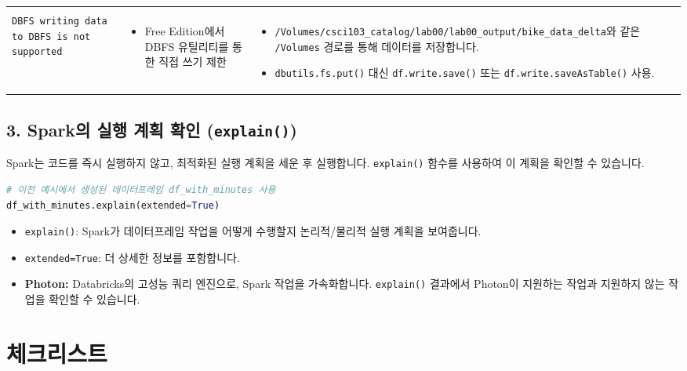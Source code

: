 \documentclass[11pt,a4paper]{article}
\begin{document}
\begin{itemize}
\begin{adjustbox}{max width=\textwidth}
\begin{tabular}{lll}
\begin{itemize}
\end{itemize} \\
\texttt{DBFS writing data to DBFS is not supported} &
\begin{itemize}
    \item Free Edition에서 DBFS 유틸리티를 통한 직접 쓰기 제한
\end{itemize} &
\begin{itemize}
    \item \texttt{/Volumes/csci103_catalog/lab00/lab00_output/bike_data_delta}와 같은 \texttt{/Volumes} 경로를 통해 데이터를 저장합니다.
    \item \texttt{dbutils.fs.put()} 대신 \texttt{df.write.save()} 또는 \texttt{df.write.saveAsTable()} 사용.
\end{itemize} \\
\bottomrule
\end{tabular}
\end{adjustbox}

\subsection*{3. Spark의 실행 계획 확인 (\texttt{explain()})}

Spark는 코드를 즉시 실행하지 않고, 최적화된 실행 계획을 세운 후 실행합니다. \texttt{explain()} 함수를 사용하여 이 계획을 확인할 수 있습니다.

\begin{lstlisting}[language=python, caption={Spark 실행 계획 확인 예시}, label={lst:spark_explain}]
# 이전 예시에서 생성된 데이터프레임 df_with_minutes 사용
df_with_minutes.explain(extended=True)
\end{lstlisting}
\begin{itemize}
    \item \texttt{explain()}: Spark가 데이터프레임 작업을 어떻게 수행할지 논리적/물리적 실행 계획을 보여줍니다.
    \item \texttt{extended=True}: 더 상세한 정보를 포함합니다.
    \item \textbf{Photon:} Databricks의 고성능 쿼리 엔진으로, Spark 작업을 가속화합니다. \texttt{explain()} 결과에서 Photon이 지원하는 작업과 지원하지 않는 작업을 확인할 수 있습니다.
\end{itemize}

\newpage

\section*{체크리스트}


\end{itemize}
\end{document}
